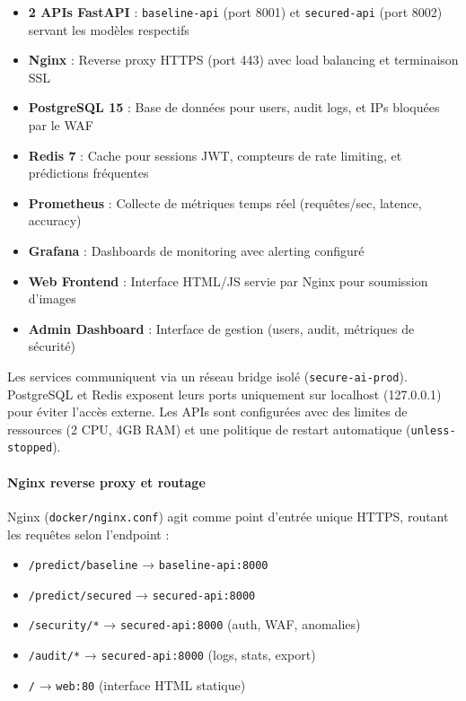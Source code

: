 \begin{itemize}
    \item \textbf{2 APIs FastAPI} : \texttt{baseline-api} (port 8001) et \texttt{secured-api} (port 8002) servant les modèles respectifs
    \item \textbf{Nginx} : Reverse proxy HTTPS (port 443) avec load balancing et terminaison SSL
    \item \textbf{PostgreSQL 15} : Base de données pour users, audit logs, et IPs bloquées par le WAF
    \item \textbf{Redis 7} : Cache pour sessions JWT, compteurs de rate limiting, et prédictions fréquentes
    \item \textbf{Prometheus} : Collecte de métriques temps réel (requêtes/sec, latence, accuracy)
    \item \textbf{Grafana} : Dashboards de monitoring avec alerting configuré
    \item \textbf{Web Frontend} : Interface HTML/JS servie par Nginx pour soumission d'images
    \item \textbf{Admin Dashboard} : Interface de gestion (users, audit, métriques de sécurité)
\end{itemize}

Les services communiquent via un réseau bridge isolé (\texttt{secure-ai-prod}). PostgreSQL et Redis exposent leurs ports uniquement sur localhost (127.0.0.1) pour éviter l'accès externe. Les APIs sont configurées avec des limites de ressources (2 CPU, 4GB RAM) et une politique de restart automatique (\texttt{unless-stopped}).

\paragraph{Nginx reverse proxy et routage}

Nginx (\texttt{docker/nginx.conf}) agit comme point d'entrée unique HTTPS, routant les requêtes selon l'endpoint :

\begin{itemize}
    \item \texttt{/predict/baseline} → \texttt{baseline-api:8000}
    \item \texttt{/predict/secured} → \texttt{secured-api:8000}
    \item \texttt{/security/*} → \texttt{secured-api:8000} (auth, WAF, anomalies)
    \item \texttt{/audit/*} → \texttt{secured-api:8000} (logs, stats, export)
    \item \texttt{/} → \texttt{web:80} (interface HTML statique)
\end{itemize}

